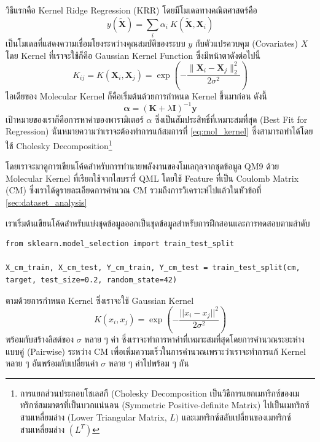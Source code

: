 วิธีแรกคือ Kernel Ridge Regression (KRR) โดยมีโมเดลทางคณิตศาสตร์คือ 
%
\begin{equation}
    y\left(\widetilde{\bm{X}} \right) 
    = 
    \sum_i \alpha_i \  K\left( \widetilde{\mathbf{X}}, \bm{X}_i\right)
\end{equation}
%
เป็นโมเดลที่แสดงความเชื่อมโยงระหว่างคุณสมบัติของระบบ $y$ กับตัวแปรควบคุม (Covariates) $X$ โดย Kernel ที่เราจะใช้ก็คือ Gaussian Kernel Function ซึ่งมีหน้าตาดังต่อไปนี้
%
\begin{equation}
    K_{ij} 
    = 
    K\left( \mathbf{X}_i, \bm{X}_j\right) 
    = 
    \exp\left( -\frac{\| \bm{X}_i - \bm{X}_j\|_2^2}{2\sigma^2}\right)
\end{equation}
%
ไอเดียของ Molecular Kernel ก็คือเริ่มต้นด้วยการกำหนด Kernel ขึ้นมาก่อน ดังนี้
%
\begin{equation}\label{eq:mol_kernel}
    \bm{\alpha} 
    = 
    (\bm{K} + \lambda \bm{I})^{-1} \bm{y}
\end{equation}
%
เป้าหมายของเราก็คือการหาค่าของพารามิเตอร์ $\alpha$ ซึ่งเป็นสัมประสิทธิ์ที่เหมาะสมที่สุด (Best Fit for Regression) นั่นหมายความว่าเราจะต้องทำการแก้สมการที่ \eqref{eq:mol_kernel} ซึ่งสามารถทำได้โดยใช้ Cholesky Decomposition\footnote{การแยกส่วนประกอบโชเลสกี (Cholesky Decomposition เป็นวิธีการแยกเมทริกซ์ของเมทริกซ์สมมาตรที่เป็นบวกแน่นอน (Symmetric Positive-definite Matrix) ไปเป็นเมทริกซ์สามเหลี่ยมล่าง (Lower Triangular Matrix, $L)$ และเมทริกซ์สลับเปลี่ยนของเมทริกซ์สามเหลี่ยมล่าง $(L^{T})$}

โดยเราจะมาดูการเขียนโค้ดสำหรับการทำนายพลังงานของโมเลกุลจากชุดข้อมูล QM9 ด้วย Molecular Kernel ที่เรียกใช้จากไลบรารี่ QML โดยใช้ Feature ที่เป็น Coulomb Matrix (CM) ซึ่งเราได้ดูรายละเอียดการคำนวณ CM รวมถึงการวิเคราะห์ไปแล้วในหัวข้อที่ \ref{sec:dataset_analysis}

\noindent เราเริ่มต้นเขียนโค้ดสำหรับแบ่งชุดข้อมูลออกเป็นชุดข้อมูลสำหรับการฝึกสอนและการทดสอบตามลำดับ
%
\begin{lstlisting}[style=MyPython]
from sklearn.model_selection import train_test_split

X_cm_train, X_cm_test, Y_cm_train, Y_cm_test = train_test_split(cm, target, test_size=0.2, random_state=42)
\end{lstlisting}

\noindent ตามด้วยการกำหนด Kernel ซึ่งเราจะใช้ Gaussian Kernel
%
\begin{equation}\label{eq:gaussian_kernel}
    K(x_{i}, x_{j}) 
    = 
    \exp \left( -\frac{||x_{i}-x_{j}||^2}{2\sigma^2} \right)
\end{equation}
%
พร้อมกับสร้างลิสต์ของ $\sigma$ หลาย ๆ ค่า ซึ่งเราจะทำการหาค่าที่เหมาะสมที่สุดโดยการคำนวณระยะห่างแบบคู่ (Pairwise) ระหว่าง CM เพื่อเพิ่มความเร็วในการคำนวณเพราะว่าเราจะทำการแก้ Kernel หลาย ๆ อันพร้อมกับเปลี่ยนค่า $\sigma$ หลาย ๆ ค่าไปพร้อม ๆ กัน

